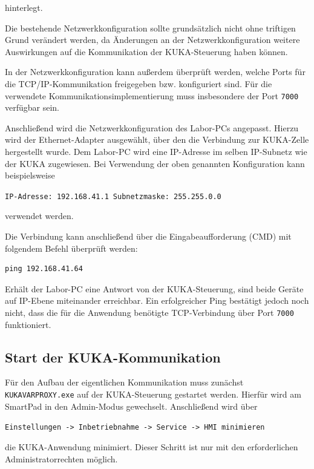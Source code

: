 hinterlegt.

Die bestehende Netzwerkkonfiguration sollte grundsätzlich nicht ohne
triftigen Grund verändert werden, da Änderungen an der
Netzwerkkonfiguration weitere Auswirkungen auf die Kommunikation der
KUKA-Steuerung haben können.

In der Netzwerkkonfiguration kann außerdem überprüft werden, welche
Ports für die TCP/IP-Kommunikation freigegeben bzw. konfiguriert sind.
Für die verwendete Kommunikationsimplementierung muss insbesondere
der Port \texttt{7000} verfügbar sein.

Anschließend wird die Netzwerkkonfiguration des Labor-PCs angepasst.
Hierzu wird der Ethernet-Adapter ausgewählt, über den die Verbindung
zur KUKA-Zelle hergestellt wurde. Dem Labor-PC wird eine IP-Adresse
im selben IP-Subnetz wie der KUKA zugewiesen. Bei Verwendung der oben
genannten Konfiguration kann beispielsweise

\begin{center}
\texttt{IP-Adresse: 192.168.41.1}\
\texttt{Subnetzmaske: 255.255.0.0}
\end{center}

verwendet werden.

Die Verbindung kann anschließend über die Eingabeaufforderung (CMD)
mit folgendem Befehl überprüft werden:

\begin{verbatim}
ping 192.168.41.64
\end{verbatim}

Erhält der Labor-PC eine Antwort von der KUKA-Steuerung, sind beide
Geräte auf IP-Ebene miteinander erreichbar. Ein erfolgreicher
Ping bestätigt jedoch noch nicht, dass die für die Anwendung
benötigte TCP-Verbindung über Port \texttt{7000} funktioniert.

\subsection{Start der KUKA-Kommunikation}

Für den Aufbau der eigentlichen Kommunikation muss zunächst
\texttt{KUKAVARPROXY.exe} auf der KUKA-Steuerung gestartet werden.
Hierfür wird am SmartPad in den Admin-Modus gewechselt.
Anschließend wird über

\begin{center}
\texttt{Einstellungen -> Inbetriebnahme -> Service -> HMI minimieren}
\end{center}

die KUKA-Anwendung minimiert. Dieser Schritt ist nur mit den
erforderlichen Administratorrechten möglich.

